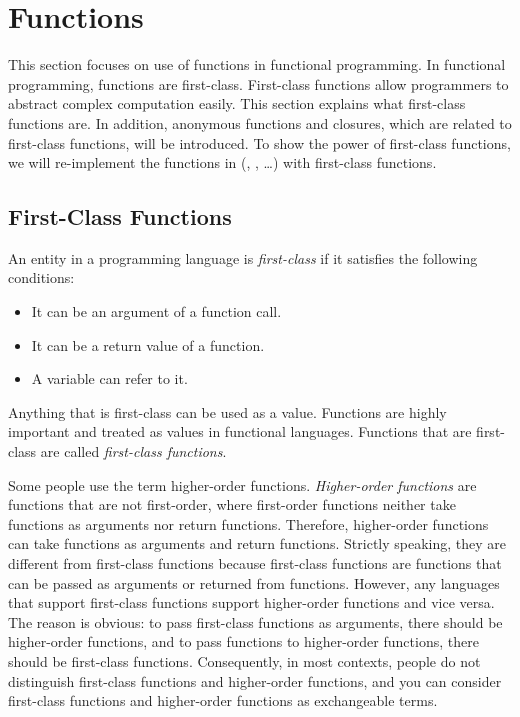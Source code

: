 \setchapterpreamble[u]{\margintoc}
\chapter{Functions}

This section focuses on use of functions in functional programming.
In functional programming, functions are first-class. First-class functions
allow programmers to abstract complex computation easily.
This section explains what first-class functions are.
In addition, anonymous functions and closures, which are related to first-class
functions, will be introduced. To show the power of first-class functions, we
will re-implement the functions in  (,
, \ldots) with first-class functions.

\section{First-Class Functions}

An entity in a programming language is \textit{first-class} if it satisfies the
following conditions:

\begin{itemize}
\item It can be an argument of a function call.
\item It can be a return value of a function.
\item A variable can refer to it.
\end{itemize}

Anything that is first-class can be used as a value. Functions are highly important and
treated as values in functional languages.
Functions that are first-class are called \textit{first-class functions}.

Some people use the term higher-order functions. \textit{Higher-order
functions} are
functions that are not first-order, where first-order functions neither take
functions as arguments nor return functions. Therefore, higher-order functions
can take functions as arguments and return functions. Strictly speaking, they
are different from first-class functions because first-class functions are
functions that can be passed as arguments or returned from functions.
However, any languages that support first-class functions support higher-order
functions and vice versa.
The reason is obvious: to pass first-class functions as arguments, there should
be higher-order functions, and to pass functions to higher-order functions,
there should be first-class functions.
Consequently, in most contexts, people do not distinguish
first-class functions and higher-order functions, and you can consider
first-class functions and higher-order functions as exchangeable terms.

